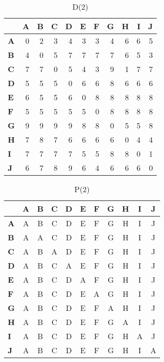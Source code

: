 \documentclass{article}
\begin{document}
\begin{table}[H]\centering
\caption{D(2)}
\begin{tabular}{l r r r r r r r r r r}
\toprule
 & \textbf{A} & \textbf{B} & \textbf{C} & \textbf{D} & \textbf{E} & \textbf{F} & \textbf{G} & \textbf{H} & \textbf{I} & \textbf{J}\\\midrule
\textbf{A} & 0 & 2 & 3 & 4 & 3 & 3 & 4 & 6 & 6 & 5 \\
\textbf{B} & 4 & 0 & 5 & 7 & 7 & 7 & 7 & 6 & 5 & 3 \\
\textbf{C} & 7 & 7 & 0 & 5 & 4 & 3 & 9 & 1 & 7 & 7 \\
\textbf{D} & 5 & 5 & 5 & 0 & 6 & 6 & 8 & 6 & 6 & 6 \\
\textbf{E} & 6 & 5 & 5 & 6 & 0 & 8 & 8 & 8 & 8 & 8 \\
\textbf{F} & 5 & 5 & 5 & 5 & 5 & 0 & 8 & 8 & 8 & 8 \\
\textbf{G} & 9 & 9 & 9 & 9 & 8 & 8 & 0 & 5 & 5 & 8 \\
\textbf{H} & 7 & 8 & 7 & 6 & 6 & 6 & 6 & 0 & 4 & 4 \\
\textbf{I} & 7 & 7 & 7 & 7 & 5 & 5 & 8 & 8 & 0 & 1 \\
\textbf{J} & 6 & 7 & 8 & 9 & 6 & 4 & 6 & 6 & 6 & 0 \\
\bottomrule
\end{tabular}
\end{table}

\begin{table}[H]\centering
\caption{P(2)}
\begin{tabular}{l c c c c c c c c c c}
\toprule
 & \textbf{A} & \textbf{B} & \textbf{C} & \textbf{D} & \textbf{E} & \textbf{F} & \textbf{G} & \textbf{H} & \textbf{I} & \textbf{J}\\\midrule
\textbf{A} & A & B & C & D & E & F & G & H & I & J \\
\textbf{B} & A & A & C & D & E & F & G & H & I & J \\
\textbf{C} & A & B & A & D & E & F & G & H & I & J \\
\textbf{D} & A & B & C & A & E & F & G & H & I & J \\
\textbf{E} & A & B & C & D & A & F & G & H & I & J \\
\textbf{F} & A & B & C & D & E & A & G & H & I & J \\
\textbf{G} & A & B & C & D & E & F & A & H & I & J \\
\textbf{H} & A & B & C & D & E & F & G & A & I & J \\
\textbf{I} & A & B & C & D & E & F & G & H & A & J \\
\textbf{J} & A & B & C & D & E & F & G & H & I & A \\
\bottomrule
\end{tabular}
\end{table}
\end{document}

